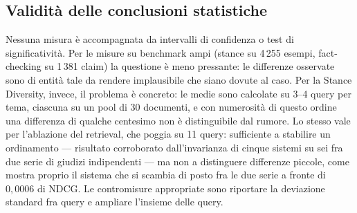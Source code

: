 \documentclass[11pt,a4paper]{report}
\begin{document}
\subsection{Validità delle conclusioni statistiche}\label{sec:validita-conclusione}
Nessuna misura è accompagnata da intervalli di confidenza o test di significatività. Per le misure
su benchmark ampi (stance su 4\,255 esempi, fact-checking su 1\,381 claim) la questione è meno
pressante: le differenze osservate sono di entità tale da rendere implausibile che siano dovute al
caso. Per la Stance Diversity, invece, il problema è concreto: le medie sono calcolate su 3--4
query per tema, ciascuna su un pool di 30 documenti, e con numerosità di questo ordine una
differenza di qualche centesimo non è distinguibile dal rumore. Lo stesso vale per l'ablazione del
retrieval, che poggia su 11 query: sufficiente a stabilire un ordinamento --- risultato corroborato
dall'invarianza di cinque sistemi su sei fra due serie di giudizi indipendenti --- ma non a
distinguere differenze piccole, come mostra proprio il sistema che si scambia di posto fra le due
serie a fronte di $0{,}0006$ di NDCG. Le contromisure appropriate sono riportare la deviazione
standard fra query e ampliare l'insieme delle query.
\end{document}
